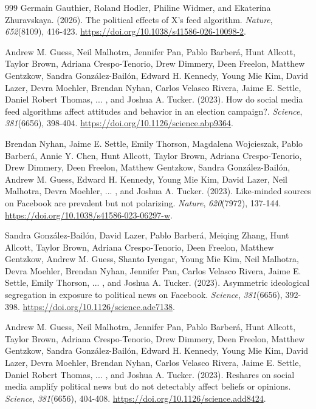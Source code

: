\begin{thebibliography}{999}
Germain Gauthier, Roland Hodler, Philine Widmer, and Ekaterina Zhuravskaya. (2026). The political effects of X's feed algorithm. \textit{Nature}, \textit{652}(8109), 416-423. \url{https://doi.org/10.1038/s41586-026-10098-2}.

Andrew M. Guess, Neil Malhotra, Jennifer Pan, Pablo Barber\'{a}, Hunt Allcott, Taylor Brown, Adriana Crespo-Tenorio, Drew Dimmery, Deen Freelon, Matthew Gentzkow, Sandra Gonz\'{a}lez-Bail\'{o}n, Edward H. Kennedy, Young Mie Kim, David Lazer, Devra Moehler, Brendan Nyhan, Carlos Velasco Rivera, Jaime E. Settle, Daniel Robert Thomas, ... , and Joshua A. Tucker. (2023). How do social media feed algorithms affect attitudes and behavior in an election campaign?. \textit{Science}, \textit{381}(6656), 398-404. \url{https://doi.org/10.1126/science.abp9364}.

Brendan Nyhan, Jaime E. Settle, Emily Thorson, Magdalena Wojcieszak, Pablo Barber\'{a}, Annie Y. Chen, Hunt Allcott, Taylor Brown, Adriana Crespo-Tenorio, Drew Dimmery, Deen Freelon, Matthew Gentzkow, Sandra Gonz\'{a}lez-Bail\'{o}n, Andrew M. Guess, Edward H. Kennedy, Young Mie Kim, David Lazer, Neil Malhotra, Devra Moehler, ... , and Joshua A. Tucker. (2023). Like-minded sources on Facebook are prevalent but not polarizing. \textit{Nature}, \textit{620}(7972), 137-144. \url{https://doi.org/10.1038/s41586-023-06297-w}.

Sandra Gonz\'{a}lez-Bail\'{o}n, David Lazer, Pablo Barber\'{a}, Meiqing Zhang, Hunt Allcott, Taylor Brown, Adriana Crespo-Tenorio, Deen Freelon, Matthew Gentzkow, Andrew M. Guess, Shanto Iyengar, Young Mie Kim, Neil Malhotra, Devra Moehler, Brendan Nyhan, Jennifer Pan, Carlos Velasco Rivera, Jaime E. Settle, Emily Thorson, ... , and Joshua A. Tucker. (2023). Asymmetric ideological segregation in exposure to political news on Facebook. \textit{Science}, \textit{381}(6656), 392-398. \url{https://doi.org/10.1126/science.ade7138}.

Andrew M. Guess, Neil Malhotra, Jennifer Pan, Pablo Barber\'{a}, Hunt Allcott, Taylor Brown, Adriana Crespo-Tenorio, Drew Dimmery, Deen Freelon, Matthew Gentzkow, Sandra Gonz\'{a}lez-Bail\'{o}n, Edward H. Kennedy, Young Mie Kim, David Lazer, Devra Moehler, Brendan Nyhan, Carlos Velasco Rivera, Jaime E. Settle, Daniel Robert Thomas, ... , and Joshua A. Tucker. (2023). Reshares on social media amplify political news but do not detectably affect beliefs or opinions. \textit{Science}, \textit{381}(6656), 404-408. \url{https://doi.org/10.1126/science.add8424}.


\end{thebibliography}
